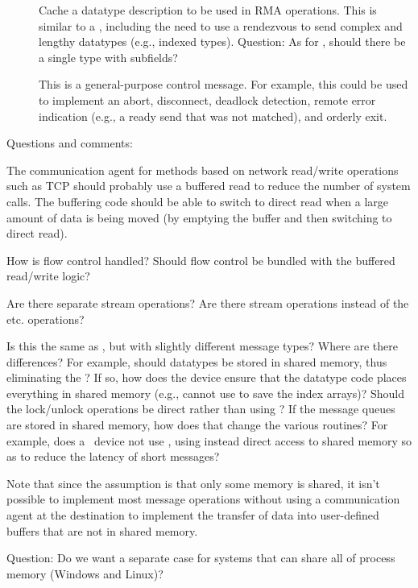 \documentclass{article}
\begin{document}
\begin{tcp}
\begin{description}
\item[]Cache a datatype description
to be used in RMA operations.  This is similar to a
, including the need to use a
rendezvous to send complex and lengthy datatypes (e.g., indexed
types).
Question: As for , should there be a
single type with subfields?  

\item[]This is a general-purpose control
message.  For example, this could be used to implement an abort,
disconnect, deadlock detection, remote error indication (e.g., a ready
send that was not matched), and orderly exit.
\end{description}

Questions and comments:

The communication agent for methods based on network read/write
operations such as TCP should probably use a buffered read to reduce
the number of system 
calls.  The buffering code should be able to switch to direct read when a
large amount of data is being moved (by emptying the buffer and then switching
to direct read).  

How is flow control handled?  Should flow control be bundled with the buffered
read/write logic?

Are there separate stream operations?  Are there stream operations
instead of the  etc. operations?
\end{tcp}

\begin{shmem}
Is this the same as \tcpname, but with slightly different message
types?
Where are there differences?  For example, should datatypes be stored
in shared memory, thus eliminating the
?  If so, how does the device ensure
that the datatype code places everything in shared memory (e.g.,
 cannot use  to save the
index arrays)?  Should the lock/unlock operations
be direct rather than using ?
If the message queues are stored in shared memory, how does that
change the various routines?  For example, does a \shmemname\ device not
use , using instead direct access to shared
memory so as to reduce the latency of short messages?

Note that since the assumption is that only some memory is shared, it
isn't possible to implement most message operations without using a
communication agent at the destination to implement the transfer of
data into user-defined buffers that are not in shared memory.

Question:  Do we want a separate case for systems that can share all
of process memory (Windows and Linux)?
\end{shmem}
\end{document}
